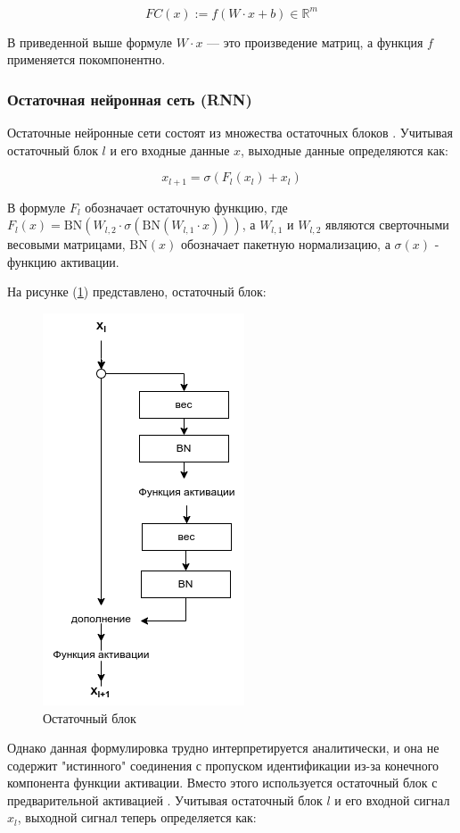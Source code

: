 \begin{equation}
    FC(x) := f(W \cdot x + b) \in \mathbb{R}^{m}
\end{equation}

В приведенной выше формуле \(W \cdot x\) — это произведение матриц, а функция \(f\) применяется покомпонентно.

\subsubsection{Остаточная нейронная сеть (RNN)}

Остаточные нейронные сети состоят из множества остаточных блоков \cite{he2016deep}. Учитывая остаточный блок \(l\) и его входные данные \(x\), выходные данные определяются как:

\begin{equation}
    x_{l + 1} = \sigma(F_{l}(x_{l}) + x_{l})
\end{equation}

В формуле \(F_{l}\) обозначает остаточную функцию, где \(F_{l}(x) = \text{BN}(W_{l,2} \cdot \sigma(\text{BN}(W_{l,1} \cdot x)))\), а \(W_{l,1}\) и \(W_{l,2}\) являются сверточными весовыми матрицами, \(\text{BN}(x)\) обозначает пакетную нормализацию, а \(\sigma(x)\) - функцию активации.

На рисунке (\ref{fig:residual-block}) представлено, остаточный блок: 
\begin{figure}[H]
	\centering
	\includegraphics[width=0.3\linewidth]{images/residual-block.png}
	\caption{Остаточный блок}
	\label{fig:residual-block}
\end{figure}

Однако данная формулировка трудно интерпретируется аналитически, и она не содержит "истинного" соединения с пропуском идентификации из-за конечного компонента функции активации. Вместо этого используется остаточный блок с предварительной активацией \cite{he2016identity}. Учитывая остаточный блок \(l\) и его входной сигнал \(x_{l}\), выходной сигнал теперь определяется как:

